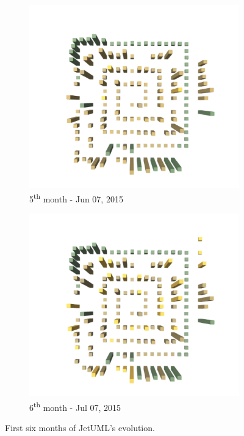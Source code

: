 \begin{figure}[ht]
    \medskip
    \begin{subfigure}{0.48\textwidth}
        \includegraphics[width=\linewidth]{JetUML_V1S5.png}
        \caption{5\textsuperscript{th} month - Jun 07, 2015} \label{fig:JetUML_V1S5}
    \end{subfigure}\hspace*{\fill}
    \begin{subfigure}{0.48\textwidth}
        \includegraphics[width=\linewidth]{JetUML_V1S6.png}
        \caption{6\textsuperscript{th} month - Jul 07, 2015} \label{fig:JetUML_V1S6}
    \end{subfigure}
    
    \caption{First six months of JetUML's evolution.} 
    \label{fig:JetUML_V1}
\end{figure}
\clearpage
